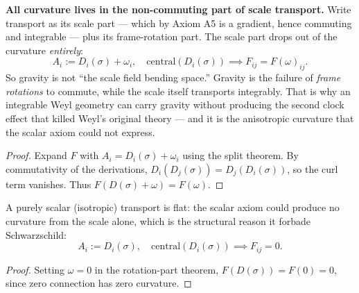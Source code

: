 \begin{theorem}
\textbf{All curvature lives in the non-commuting part of scale transport.} Write transport as its scale part — which by Axiom A5 is a gradient, hence commuting and integrable — plus its frame-rotation part. The scale part drops out of the curvature \emph{entirely}:
\[
A_i := D_i(\sigma) + \omega_i, \quad \text{central}(D_i(\sigma)) \implies F_{ij} = F(\omega)_{ij}.
\]
So gravity is not ``the scale field bending space.'' Gravity is the failure of \emph{frame rotations} to commute, while the scale itself transports integrably. That is why an integrable Weyl geometry can carry gravity without producing the second clock effect that killed Weyl's original theory — and it is the anisotropic curvature that the scalar axiom could not express.
\begin{proof}
Expand $F$ with $A_i = D_i(\sigma) + \omega_i$ using the split theorem. By commutativity of the derivations, $D_i(D_j(\sigma)) = D_j(D_i(\sigma))$, so the curl term vanishes. Thus $F(D(\sigma) + \omega) = F(\omega)$.
\end{proof}
\end{theorem}

\begin{theorem}
A purely scalar (isotropic) transport is flat: the scalar axiom could produce no curvature from the scale alone, which is the structural reason it forbade Schwarzschild:
\[
A_i := D_i(\sigma), \quad \text{central}(D_i(\sigma)) \implies F_{ij} = 0.
\]
\begin{proof}
Setting $\omega = 0$ in the rotation-part theorem, $F(D(\sigma)) = F(0) = 0$, since zero connection has zero curvature.
\end{proof}
\end{theorem}

